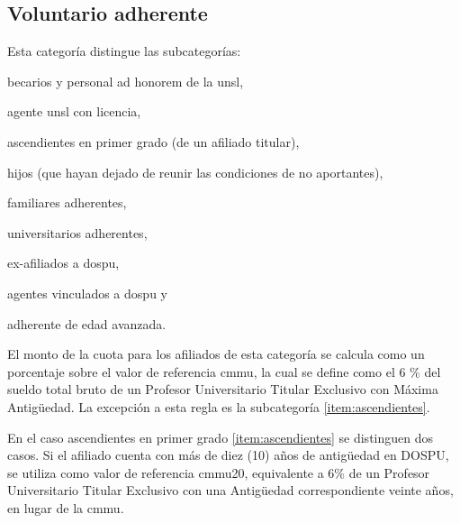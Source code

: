 \subsection{Voluntario adherente} \label{sec:adherente}

Esta categoría distingue las subcategorías:
\begin{enumerate*}[label=(\alph*)]
    \item becarios y personal ad honorem de la \acrshort{unsl}, 
    \item agente \acrshort{unsl} con licencia, 
    \item 
    \label{item:ascendientes}
    ascendientes en primer grado (de un afiliado titular), 
    \item hijos (que hayan dejado de reunir las condiciones de no aportantes), 
    \item familiares adherentes, 
    \item universitarios adherentes, 
    \item ex-afiliados a \acrshort{dospu}, 
    \item agentes vinculados a \acrshort{dospu} y 
    \item 
    \label{item:avanzada}
    adherente de edad avanzada.
\end{enumerate*} 

El monto de la cuota para los afiliados de esta categoría se calcula como un porcentaje sobre el valor de referencia \acrfull{cmmu}, la cual se define como el 6 \% del sueldo total bruto de un Profesor Universitario Titular Exclusivo con Máxima Antigüedad. %
La excepción a esta regla es la subcategoría \ref{item:ascendientes}.



En el caso ascendientes en primer grado \ref{item:ascendientes} se distinguen dos casos.
Si el afiliado cuenta con más de diez (10) años de antigüedad en DOSPU, se utiliza como valor de referencia \acrshort{cmmu}20, equivalente a 6\% de un Profesor Universitario Titular Exclusivo con una Antigüedad correspondiente veinte años, en lugar de la \acrshort{cmmu}\cite{dospuRes60}.

